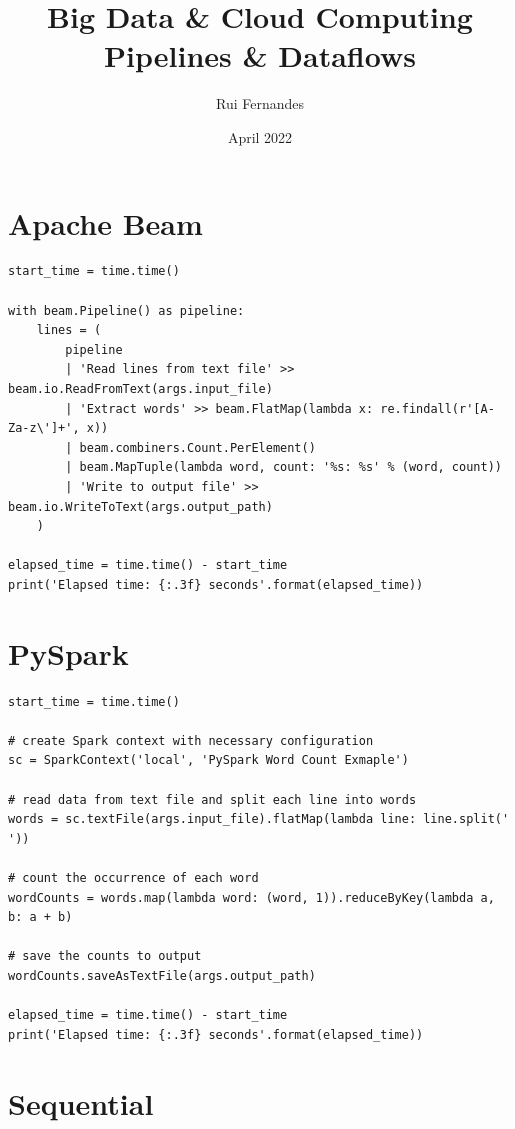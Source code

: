 \documentclass[a4paper, 11pt]{article}
\title{Big Data \& Cloud Computing \\ [0.8em] \smaller Pipelines \& Dataflows}
\author{Rui Fernandes}
\date{April 2022}
\begin{document}
\maketitle

\section{Apache Beam}

\begin{verbatim}
start_time = time.time()

with beam.Pipeline() as pipeline:
    lines = (
        pipeline
        | 'Read lines from text file' >> beam.io.ReadFromText(args.input_file)
        | 'Extract words' >> beam.FlatMap(lambda x: re.findall(r'[A-Za-z\']+', x))
        | beam.combiners.Count.PerElement()
        | beam.MapTuple(lambda word, count: '%s: %s' % (word, count))
        | 'Write to output file' >> beam.io.WriteToText(args.output_path)
    )

elapsed_time = time.time() - start_time
print('Elapsed time: {:.3f} seconds'.format(elapsed_time))
\end{verbatim}

\section{PySpark}

\begin{verbatim}
start_time = time.time()

# create Spark context with necessary configuration
sc = SparkContext('local', 'PySpark Word Count Exmaple')

# read data from text file and split each line into words
words = sc.textFile(args.input_file).flatMap(lambda line: line.split(' '))

# count the occurrence of each word
wordCounts = words.map(lambda word: (word, 1)).reduceByKey(lambda a, b: a + b)

# save the counts to output
wordCounts.saveAsTextFile(args.output_path)

elapsed_time = time.time() - start_time
print('Elapsed time: {:.3f} seconds'.format(elapsed_time))
\end{verbatim}

\vspace{\baselineskip}

\section{Sequential}
\end{document}
